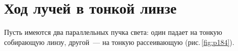 \documentclass[main.tex]{subfiles}
\begin{document}

 

 

 
   

\section{Ход лучей в тонкой линзе}



Пусть имеются два параллельных пучка света: один падает на тонкую собирающую линзу, другой~---  на тонкую рассеивающую (рис.\,\ref{fig:p184}).
\end{document}
